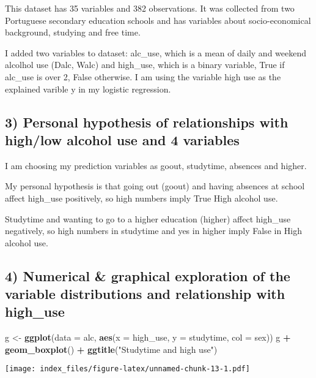 \documentclass[]{article}
\newenvironment{Shaded}{\begin{snugshade}}{\end{snugshade}}
\newcommand{\KeywordTok}[1]{\textcolor[rgb]{0.13,0.29,0.53}{\textbf{#1}}}
\newcommand{\DataTypeTok}[1]{\textcolor[rgb]{0.13,0.29,0.53}{#1}}
\newcommand{\StringTok}[1]{\textcolor[rgb]{0.31,0.60,0.02}{#1}}
\newcommand{\OperatorTok}[1]{\textcolor[rgb]{0.81,0.36,0.00}{\textbf{#1}}}
\newcommand{\NormalTok}[1]{#1}
\begin{document}
This dataset has 35 variables and 382 observations. It was collected
from two Portuguese secondary education schools and has variables about
socio-economical background, studying and free time.

I added two variables to dataset: alc\_use, which is a mean of daily and
weekend alcolhol use (Dalc, Walc) and high\_use, which is a binary
variable, True if alc\_use is over 2, False otherwise. I am using the
variable high use as the explained varible y in my logistic regression.

\subsection{3) Personal hypothesis of relationships with high/low
alcohol use and 4
variables}\label{personal-hypothesis-of-relationships-with-highlow-alcohol-use-and-4-variables}

I am choosing my prediction variables as goout, studytime, absences and
higher.

My personal hypothesis is that going out (goout) and having absences at
school affect high\_use positively, so high numbers imply True High
alcohol use.

Studytime and wanting to go to a higher education (higher) affect
high\_use negatively, so high numbers in studytime and yes in higher
imply False in High alcohol use.

\subsection{4) Numerical \& graphical exploration of the variable
distributions and relationship with
high\_use}\label{numerical-graphical-exploration-of-the-variable-distributions-and-relationship-with-high_use}

\begin{Shaded}
\begin{Highlighting}[]
\NormalTok{g <-}\StringTok{ }\KeywordTok{ggplot}\NormalTok{(}\DataTypeTok{data =}\NormalTok{ alc, }\KeywordTok{aes}\NormalTok{(}\DataTypeTok{x =}\NormalTok{ high_use, }\DataTypeTok{y =}\NormalTok{ studytime, }\DataTypeTok{col =}\NormalTok{ sex))}
\NormalTok{g  }\OperatorTok{+}\StringTok{ }\KeywordTok{geom_boxplot}\NormalTok{() }\OperatorTok{+}\StringTok{ }\KeywordTok{ggtitle}\NormalTok{(}\StringTok{"Studytime and high use"}\NormalTok{)}
\end{Highlighting}
\end{Shaded}

\texttt{[image: index\_files/figure-latex/unnamed-chunk-13-1.pdf]}
\end{document}
